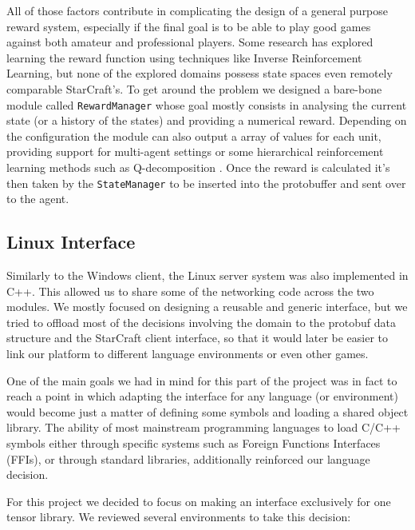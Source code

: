 All of those factors contribute in complicating the design of a general purpose
reward system, especially if the final goal is to be able to play good games
against both amateur and professional players. Some research has explored
learning the reward function using techniques like Inverse Reinforcement
Learning\citep{ng2000algorithms}, but none of the explored domains possess state
spaces even remotely comparable StarCraft's.
To get around the problem we designed a bare-bone module called
\texttt{RewardManager} whose goal mostly consists in analysing the current state
(or a history of the states) and providing a numerical reward. Depending on the
configuration the module can also output a array of values for each unit,
providing support for multi-agent settings or some hierarchical reinforcement
learning methods such as Q-decomposition \citep{russell2003q}. Once the reward
is calculated it's then taken by the \texttt{StateManager} to be inserted into
the protobuffer and sent over to the agent.


\subsection{Linux Interface}

Similarly to the Windows client, the Linux server system was also implemented in
C++. This allowed us to share some of the networking code across the two
modules. We mostly focused on designing a reusable and generic interface, but we
tried to offload most of the decisions involving the domain to the protobuf data
structure and the StarCraft client interface, so that it would later be easier
to link our platform to different language environments or even other games.

One of the main goals we had in mind for this part of the project was in fact to
reach a point in which adapting the interface for any language (or environment)
would become just a matter of defining some symbols and loading a shared object
library. The ability of most mainstream programming languages to load C/C++
symbols either through specific systems such as Foreign Functions Interfaces
(FFIs), or through standard libraries, additionally reinforced our language
decision.

For this project we decided to focus on making an interface exclusively for one
tensor library. We reviewed several environments to take this decision:

